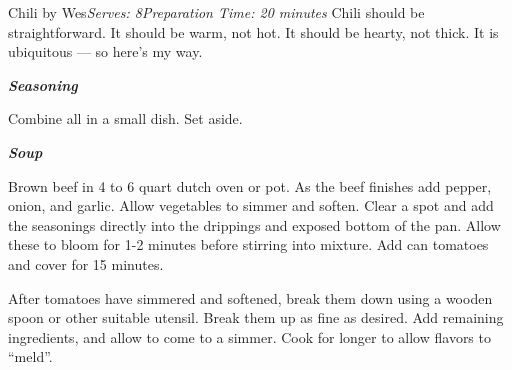 \documentclass{article}
\begin{document}
\begin{recipe}{Chili by Wes}{\textit{Serves: 8}}{\textit{Preparation Time: 20 minutes}}
  \freeform
    Chili should be straightforward.
    It should be warm, not hot.
    It should be hearty, not thick.
    It is ubiquitous --- so here's my way.

  \freeform
    \textbf{\textit{Seasoning}}

    Combine all in a small dish.
    Set aside.

  \freeform
    \textbf{\textit{Soup}}

    Brown beef in 4 to 6 quart dutch oven or pot.
    As the beef finishes add pepper, onion, and garlic.
    Allow vegetables to simmer and soften.
    Clear a spot and add the seasonings directly into the drippings and exposed bottom of the pan.
    Allow these to bloom for 1-2 minutes before stirring into mixture.
    Add can tomatoes and cover for 15 minutes.

    After tomatoes have simmered and softened, break them down using a wooden spoon or other suitable utensil.
    Break them up as fine as desired.
    Add remaining ingredients, and allow to come to a simmer.
    Cook for longer to allow flavors to ``meld''.

\end{recipe}
\end{document}
